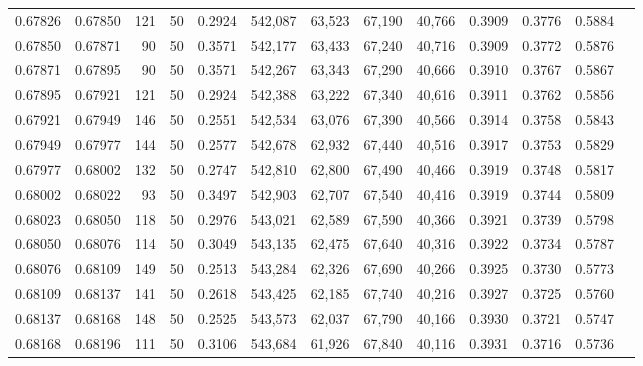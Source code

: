 \begin{tabular}{rrrrrrrrrrrrr}
0.67826 & 0.67850 &   121 &  50 &                                     0.2924 & 542,087 &  63,523 &  67,190 &  40,766 & 0.3909 & 0.3776 & 0.5884 \\
0.67850 & 0.67871 &    90 &  50 &                                     0.3571 & 542,177 &  63,433 &  67,240 &  40,716 & 0.3909 & 0.3772 & 0.5876 \\
0.67871 & 0.67895 &    90 &  50 &                                     0.3571 & 542,267 &  63,343 &  67,290 &  40,666 & 0.3910 & 0.3767 & 0.5867 \\
0.67895 & 0.67921 &   121 &  50 &                                     0.2924 & 542,388 &  63,222 &  67,340 &  40,616 & 0.3911 & 0.3762 & 0.5856 \\
0.67921 & 0.67949 &   146 &  50 &                                     0.2551 & 542,534 &  63,076 &  67,390 &  40,566 & 0.3914 & 0.3758 & 0.5843 \\
0.67949 & 0.67977 &   144 &  50 &                                     0.2577 & 542,678 &  62,932 &  67,440 &  40,516 & 0.3917 & 0.3753 & 0.5829 \\
0.67977 & 0.68002 &   132 &  50 &                                     0.2747 & 542,810 &  62,800 &  67,490 &  40,466 & 0.3919 & 0.3748 & 0.5817 \\
0.68002 & 0.68022 &    93 &  50 &                                     0.3497 & 542,903 &  62,707 &  67,540 &  40,416 & 0.3919 & 0.3744 & 0.5809 \\
0.68023 & 0.68050 &   118 &  50 &                                     0.2976 & 543,021 &  62,589 &  67,590 &  40,366 & 0.3921 & 0.3739 & 0.5798 \\
0.68050 & 0.68076 &   114 &  50 &                                     0.3049 & 543,135 &  62,475 &  67,640 &  40,316 & 0.3922 & 0.3734 & 0.5787 \\
0.68076 & 0.68109 &   149 &  50 &                                     0.2513 & 543,284 &  62,326 &  67,690 &  40,266 & 0.3925 & 0.3730 & 0.5773 \\
0.68109 & 0.68137 &   141 &  50 &                                     0.2618 & 543,425 &  62,185 &  67,740 &  40,216 & 0.3927 & 0.3725 & 0.5760 \\
0.68137 & 0.68168 &   148 &  50 &                                     0.2525 & 543,573 &  62,037 &  67,790 &  40,166 & 0.3930 & 0.3721 & 0.5747 \\
0.68168 & 0.68196 &   111 &  50 &                                     0.3106 & 543,684 &  61,926 &  67,840 &  40,116 & 0.3931 & 0.3716 & 0.5736 \\

\end{tabular}
